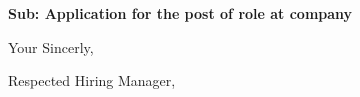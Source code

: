 \documentclass[11pt,a4paper,roman]{moderncv}
\begin{document}
\date{\today}
\opening{\textbf{Sub: Application for the post of {role} at {company}}}
\closing{Your Sincerly, \vspace{-1em}}


\makelettertitle



Respected Hiring Manager,
\end{document}
